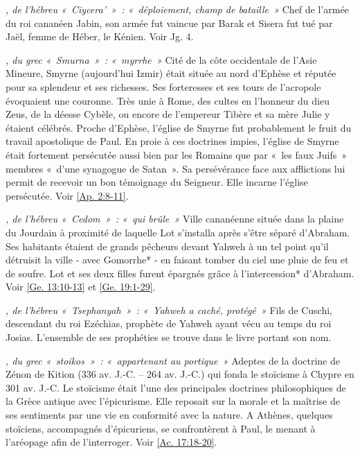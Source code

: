 \begin{multicols}{2}
\textit{, de l'hébreu «~Ciycera'~»~: «~déploiement, champ de bataille~»}\newline
Chef de l'armée du roi cananéen Jabin, son armée fut vaincue par Barak et Sisera fut tué par Jaël, femme de Héber, le Kénien. Voir Jg. 4.

\textit{, du grec «~Smurna~»~: «~myrrhe~»}\newline
Cité de la côte occidentale de l'Asie Mineure, Smyrne (aujourd'hui Izmir) était située au nord d'Ephèse et réputée pour sa splendeur et ses richesses. Ses forteresses et ses tours de l'acropole évoquaient une couronne. Très unie à Rome, des cultes en l'honneur du dieu Zeus, de la déesse Cybèle, ou encore de l'empereur Tibère et sa mère Julie y étaient célébrés. Proche d'Ephèse, l'église de Smyrne fut probablement le fruit du travail apostolique de Paul. En proie à ces doctrines impies, l'église de Smyrne était fortement persécutée aussi bien par les Romains que par «~les faux Juifs~» membres «~d'une synagogue de Satan~». Sa persévérance face aux afflictions lui permit de recevoir un bon témoignage du Seigneur. Elle incarne l'église persécutée. Voir \vref{Ap. 2:8-11}.

\textit{, de l'hébreu «~Cedom~»~: «~qui brûle~»}\newline
Ville cananéenne située dans la plaine du Jourdain à proximité de laquelle Lot s'installa après s'être séparé d'Abraham. Ses habitants étaient de grands pêcheurs devant Yahweh à un tel point qu'il détruisit la ville - avec Gomorrhe* - en faisant tomber du ciel une pluie de feu et de soufre. Lot et ses deux filles furent épargnés grâce à l'intercession* d'Abraham. Voir \vref{Ge. 13:10-13} et \vref{Ge. 19:1-29}.

\textit{, de l'hébreu «~Tsephanyah~»~: «~Yahweh a caché, protégé~»}\newline
Fils de Cuschi, descendant du roi Ezéchias, prophète de Yahweh ayant vécu au temps du roi Josias. L'ensemble de ses prophéties se trouve dans le livre portant son nom.

\textit{, du grec «~stoikos~»~: «~appartenant au portique~»}\newline
Adeptes de la doctrine de Zénon de Kition (336 av. J.-C. – 264 av. J.-C.) qui fonda le stoïcisme à Chypre en 301 av. J.-C. Le stoïcisme était l'une des principales doctrines philosophiques de la Grèce antique avec l'épicurisme. Elle reposait sur la morale et la maîtrise de ses sentiments par une vie en conformité avec la nature. A Athènes, quelques stoïciens, accompagnés d'épicuriens, se confrontèrent à Paul, le menant à l'aréopage afin de l'interroger. Voir \vref{Ac. 17:18-20}.


\end{multicols}
